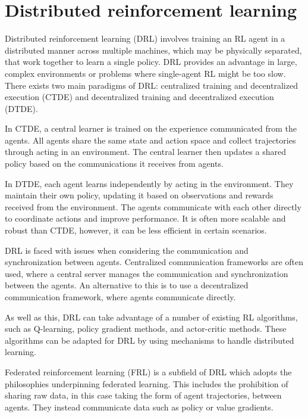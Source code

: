 \section{Distributed reinforcement learning}

Distributed reinforcement learning (DRL) involves training an RL agent in a distributed manner across multiple machines, which may be physically separated, that work together to learn a single policy. DRL provides an advantage in large, complex environments or problems where single-agent RL might be too slow.
There exists two main paradigms of DRL: centralized training and decentralized execution (CTDE) and decentralized training and decentralized execution (DTDE).

In CTDE, a central learner is trained on the experience communicated from the agents. All agents share the same state and action space and collect trajectories through acting in an environment. The central learner then updates a shared policy based on the communications it receives from agents. 

In DTDE, each agent learns independently by acting in the environment. They maintain their own policy, updating it based on observations and rewards received from the environment. The agents communicate with each other directly to coordinate actions and improve performance. It is often more scalable and robust than CTDE, however, it can be less efficient in certain scenarios.

DRL is faced with issues when considering the communication and synchronization between agents. Centralized communication frameworks are often used, where a central server manages the communication and synchronization between the agents. An alternative to this is to use a decentralized communication framework, where agents communicate directly.

As well as this, DRL can take advantage of a number of existing RL algorithms, such as Q-learning, policy gradient methods, and actor-critic methods. These algorithms can be adapted for DRL by using mechanisms to handle distributed learning.

Federated reinforcement learning (FRL) is a subfield of DRL which adopts the philosophies underpinning federated learning. This includes the prohibition of sharing raw data, in this case taking the form of agent trajectories, between agents. They instead communicate data such as policy or value gradients.


